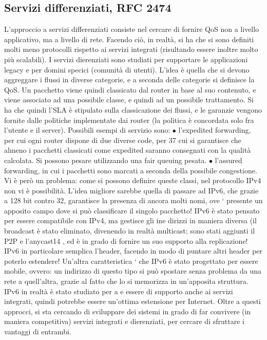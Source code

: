 \subsection{Servizi differenziati, RFC 2474}
L'approccio a servizi differenziati consiste nel cercare di fornire QoS non a livello
applicativo, ma a livello di rete. Facendo ciò, in realtà, si ha che si sono definiti
molti meno protocolli rispetto ai servizi integrati (risultando essere inoltre molto
più scalabili). I servizi dierenziati sono studiati per supportare le applicazioni
legacy e per domini specici (comunità di utenti). L'idea è quella che si devono
aggreggare i flussi in diverse categorie, e a seconda delle categorie si definisce la
QoS. Un pacchetto viene quindi classicato dal router in base al suo contenuto,
e viene associato ad una possibile classe, e quindi ad un possibile trattamento.
Si ha che quindi l'SLA è stipulato sulla classicazione dei flussi, e le garanzie
vengono fornite dalle politiche implementate dai router (la politica è concordata
solo fra l'utente e il server).
Possibili esempi di servizio sono:
$\bullet$ l'expedited forwarding, per cui ogni router dispone di due diverse code, per
37
cui si garantisce che almeno i pacchetti classicati come expedited saranno
consegnati con la qualità calcolata. Si possono pesare utilizzando una fair
queuing pesata.
$\bullet$ l'assured forwarding, in cui i pacchetti sono marcati a seconda della possibile congestione.
Vi è però un problema: come si possono definire queste classi, nel protocollo
IPv4 non vi è possibilità. L'idea migliore sarebbe quella di passare ad IPv6, che
grazie a 128 bit contro 32, garantisce la presenza di ancora molti nomi, ove `
presente un apposito campo dove si può classificare il singolo pacchetto!
IPv6 è stato pensato per essere compatibile con IPv4, ma gestisce gli ine
dirizzi in maniera diversa (il broadcast è stato eliminato, divenendo in realtà
multicast; sono stati aggiunti il P2P e l'anycast14 , ed è in grado di fornire un
suo supporto alla replicazione! IPv6 in particolare semplica l'header, facendo
in modo di puntare altri header per poterlo estendere! Un'altra caratteristica
` che IPv6 è stato progettato per essere mobile, ovvero: un indirizzo di questo
tipo si può spostare senza problema da una rete a quell'altra, grazie al fatto che
lo si memorizza in un'apposita struttura. IPv6 in realtà è stato studiato per
a e
essere di supporto anche ai servizi integrati, quindi potrebbe essere un'ottima
estensione per Internet.
Oltre a questi approcci, si sta cercando di sviluppare dei sistemi in grado
di far convivere (in maniera competitiva) servizi integrati e dierenziati, per
cercare di sfruttare i vantaggi di entrambi.
